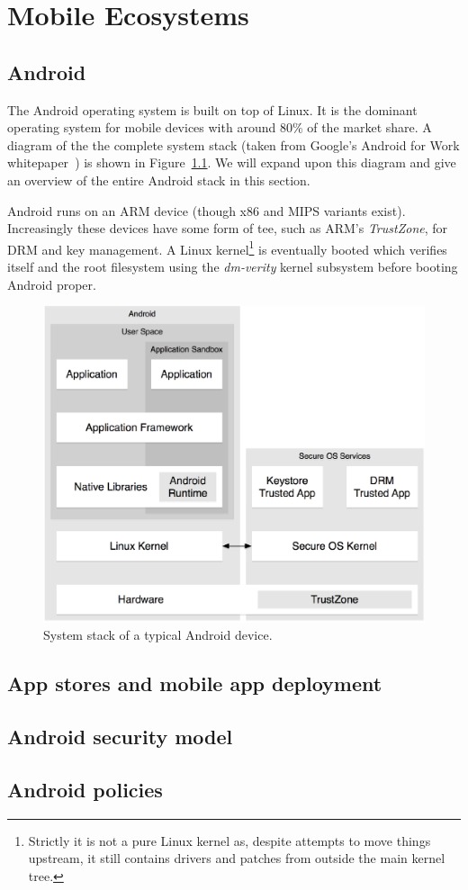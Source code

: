 \documentclass[thesis.tex]{subfiles}
\begin{document}
\chapter{Mobile Ecosystems}

\section{Android}

The Android operating system is built on top of Linux.
It is the dominant operating system for mobile devices with around 80\% of the market share.
A diagram of the the complete system stack (taken from Google's Android for Work whitepaper~\cite{Google:2015vl}) is shown in Figure~\ref{fig:android_stack}.
We will expand upon this diagram and give an overview of the entire Android stack in this section.

Android runs on an ARM device (though x86 and MIPS variants exist).
Increasingly these devices have some form of \ac{tee}, such as ARM's \emph{TrustZone}, for DRM and key management.
A Linux kernel\footnote{Strictly it is not a pure Linux kernel as, despite attempts to move things upstream, it still contains drivers and patches from outside the main kernel tree.}  is eventually booted which verifies itself and the root filesystem using the \emph{dm-verity} kernel subsystem before booting Android proper.





\begin{figure}
  \includegraphics[width=1.0\linewidth]{chapters/02-mobile-ecosystems/figures/android-stack.eps}
  \caption{System stack of a typical Android device.}
  \label{fig:android_stack}
\end{figure}

\section{App stores and mobile app deployment}

\section{Android security model}



\section{Android policies}
\end{document}
